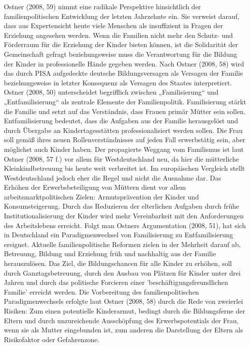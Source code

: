 Ostner (2008, 59) nimmt eine radikale Perspektive hinsichtlich der familienpolitischen Entwicklung der letzten Jahrzehnte ein. Sie verweist darauf, dass aus Expertensicht heute viele Menschen als insuffizient in Fragen der Erziehung angesehen werden. Wenn die Familien nicht mehr den Schutz- und Förderraum für die Erziehung der Kinder bieten können, ist die Solidarität der Gemeinschaft gefragt beziehungsweise muss die Verantwortung für die Bildung der Kinder in professionelle Hände gegeben werden. Nach Ostner (2008, 58) wird das durch PISA aufgedeckte deutsche Bildungsversagen als Versagen der Familie beziehungsweise in letzter Konsequenz als Versagen des Staates interpretiert. Ostner (2008, 50) unterscheidet begrifflich zwischen „Familisierung“ und „Entfamilisierung“ als zentrale Elemente der Familienpolitik. Familisierung stärkt die Familie und setzt auf das Verständnis, dass Frauen primär Mütter sein sollen. Entfamilisierung bedeutet, dass die Aufgaben aus der Familie herausgelöst und durch Übergabe an Kindertagesstätten professionalisiert werden sollen. Die Frau soll gemäß ihres neuen Rollenverständnisses auf jeden Fall erwerbstätig sein, aber möglichst auch Kinder haben. Der propagierte Weggang vom Familismus ist laut Ostner (2008, 57 f.) vor allem für Westdeutschland neu, da hier die mütterliche Kleinkindbetreuung bis heute weit verbreitet ist. Im europäischen Vergleich stellt Westdeutschland jedoch eher die Regel und nicht die Ausnahme dar. Das Erhöhen der Erwerbsbeteiligung von Müttern dient vor allem arbeitsmarktpolitischen Zielen: Armutsprävention der Kinder und  Konsumsteigerung. 
Durch das Reduzieren der elterlichen Aufgaben durch frühe Institutionalisierung der Kinder wird mehr Vereinbarkeit mit den Anforderungen des Arbeitslebens erreicht. Folgt man Ostners Argumentation (2008, 51), hat sich in Deutschland ein Paradigmenwechsel von Familisierung zu Entfamilisierung ereignet. Aktuelle familienpolitische Reformen zielen in der Mehrheit darauf ab, Betreuung, Bildung und Erziehung früh und nachhaltig aus der Familie herauszulösen. Das Ziel, die Bildungschancen für alle Kinder zu erhöhen, soll durch Ganztagsbetreuung, durch den Ausbau von Plätzen für Kinder unter drei Jahren und durch das politische Forcieren einer 'beschäftigungsfreundlichen Familie' erreicht werden. Die Vorbereitung des familienpolitischen Paradigmenwechsels erfolgte laut Ostner (2008, 58) durch die Rede von zweierlei Risiken: Zum einen potentielle Kinderarmut, bedingt durch die Bildungsferne der Eltern und durch unzureichende Ausschöpfung des Erwerbspotentials der Frau, wenn sie als Mutter eingebunden ist, zum anderen die Darstellung der Eltern als Risikofaktor oder Gefahrenzone.  


